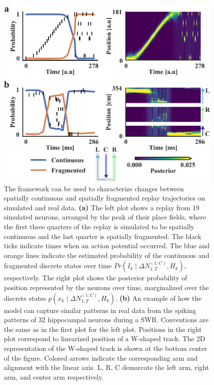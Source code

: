 \documentclass[conference]{IEEEtran}
\begin{document}
\begin{figure}[t]
\centerline{\includegraphics{fig1.pdf}}
\caption{The framework can be used to characterize changes between spatially continuous and spatially fragmented replay trajectories on simulated and real data. \textbf{(a)} The left plot shows a replay from 19 simulated neurons, arranged by the peak of their place fields, where the first three quarters of the replay is simulated to be spatially continuous and the last quarter is spatially fragmented. The black ticks indicate times when an action potential occurred. The blue and orange lines indicate the estimated probability of the continuous and fragmented discrete states over time $Pr(I_{k} \mid \Delta N_{1:T}^{(1:C)}, H_{k})$, respectively. The right plot shows the posterior probability of position represented by the neurons over time, marginalized over the discrete states $p(x_{k} \mid \Delta N_{1:T}^{(1:C)}, H_{k})$. \textbf{(b)} An example of how the model can capture similar patterns in real data from the spiking patterns of 32 hippocampal neurons during a SWR. Conventions are the same as in the first plot for the left plot. Positions in the right plot correspond to linearized position of a W-shaped track. The 2D representation of the W-shaped track is shown at the bottom center of the figure. Colored arrows indicate the corresponding arm and alignment with the linear axis. L, R, C demarcate the left arm, right arm, and center arm respectively.}
\label{fig1}
\end{figure}
\end{document}
